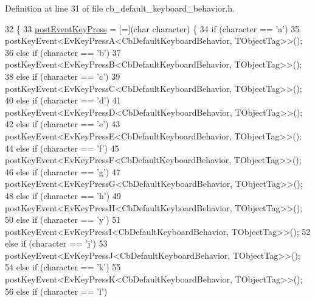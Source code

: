 Definition at line 31 of file cb\+\_\+default\+\_\+keyboard\+\_\+behavior.\+h.


\begin{DoxyCode}
32     \{
33         \hyperlink{classsm__three__some_1_1cl__keyboard_1_1CbDefaultKeyboardBehavior_a8d0fbc335dd7a4ee8b5d7f8e1c1be955}{postEventKeyPress} = [=](\textcolor{keywordtype}{char} character) \{
34             \textcolor{keywordflow}{if} (character == \textcolor{charliteral}{'a'})
35                 postKeyEvent<EvKeyPressA<CbDefaultKeyboardBehavior, TObjectTag>>();
36             \textcolor{keywordflow}{else} \textcolor{keywordflow}{if} (character == \textcolor{charliteral}{'b'})
37                 postKeyEvent<EvKeyPressB<CbDefaultKeyboardBehavior, TObjectTag>>();
38             \textcolor{keywordflow}{else} \textcolor{keywordflow}{if} (character == \textcolor{charliteral}{'c'})
39                 postKeyEvent<EvKeyPressC<CbDefaultKeyboardBehavior, TObjectTag>>();
40             \textcolor{keywordflow}{else} \textcolor{keywordflow}{if} (character == \textcolor{charliteral}{'d'})
41                 postKeyEvent<EvKeyPressD<CbDefaultKeyboardBehavior, TObjectTag>>();
42             \textcolor{keywordflow}{else} \textcolor{keywordflow}{if} (character == \textcolor{charliteral}{'e'})
43                 postKeyEvent<EvKeyPressE<CbDefaultKeyboardBehavior, TObjectTag>>();
44             \textcolor{keywordflow}{else} \textcolor{keywordflow}{if} (character == \textcolor{charliteral}{'f'})
45                 postKeyEvent<EvKeyPressF<CbDefaultKeyboardBehavior, TObjectTag>>();
46             \textcolor{keywordflow}{else} \textcolor{keywordflow}{if} (character == \textcolor{charliteral}{'g'})
47                 postKeyEvent<EvKeyPressG<CbDefaultKeyboardBehavior, TObjectTag>>();
48             \textcolor{keywordflow}{else} \textcolor{keywordflow}{if} (character == \textcolor{charliteral}{'h'})
49                 postKeyEvent<EvKeyPressH<CbDefaultKeyboardBehavior, TObjectTag>>();
50             \textcolor{keywordflow}{else} \textcolor{keywordflow}{if} (character == \textcolor{charliteral}{'y'})
51                 postKeyEvent<EvKeyPressI<CbDefaultKeyboardBehavior, TObjectTag>>();
52             \textcolor{keywordflow}{else} \textcolor{keywordflow}{if} (character == \textcolor{charliteral}{'j'})
53                 postKeyEvent<EvKeyPressJ<CbDefaultKeyboardBehavior, TObjectTag>>();
54             \textcolor{keywordflow}{else} \textcolor{keywordflow}{if} (character == \textcolor{charliteral}{'k'})
55                 postKeyEvent<EvKeyPressK<CbDefaultKeyboardBehavior, TObjectTag>>();
56             \textcolor{keywordflow}{else} \textcolor{keywordflow}{if} (character == \textcolor{charliteral}{'l'})

\end{DoxyCode}

